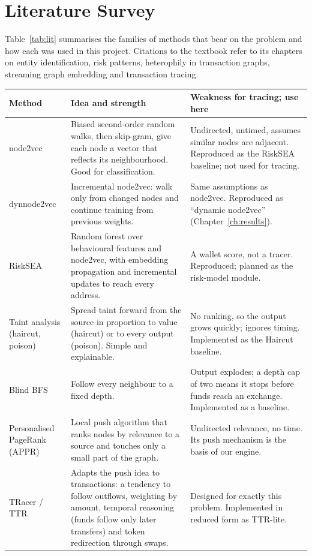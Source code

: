 \section{Literature Survey}
\label{sec:litsurvey}
Table~\ref{tab:lit} summarises the families of methods that bear on the problem and how each was used in this project. Citations to the textbook refer to its chapters on entity identification, risk patterns, heterophily in transaction graphs, streaming graph embedding and transaction tracing.

\begin{table}[H]
\centering\small\singlespacing
\begin{tabular}{p{2.9cm} p{4.7cm} p{4.7cm}}
\toprule
\textbf{Method} & \textbf{Idea and strength} & \textbf{Weakness for tracing; use here}\\
\midrule
node2vec \cite{node2vec} & Biased second-order random walks, then skip-gram, give each node a vector that reflects its neighbourhood. Good for classification. & Undirected, untimed, assumes similar nodes are adjacent. Reproduced as the RiskSEA baseline; not used for tracing.\\
dynnode2vec \cite{dynnode2vec} & Incremental node2vec: walk only from changed nodes and continue training from previous weights. & Same assumptions as node2vec. Reproduced as ``dynamic node2vec'' (Chapter~\ref{ch:results}).\\
RiskSEA \cite{risksea} & Random forest over behavioural features and node2vec, with embedding propagation and incremental updates to reach every address. & A wallet score, not a tracer. Reproduced; planned as the risk-model module.\\
Taint analysis (haircut, poison) \cite{textbook} & Spread taint forward from the source in proportion to value (haircut) or to every output (poison). Simple and explainable. & No ranking, so the output grows quickly; ignores timing. Implemented as the Haircut baseline.\\
Blind BFS \cite{textbook} & Follow every neighbour to a fixed depth. & Output explodes; a depth cap of two means it stops before funds reach an exchange. Implemented as a baseline.\\
Personalised PageRank (APPR) \cite{pagerank,appr} & Local push algorithm that ranks nodes by relevance to a source and touches only a small part of the graph. & Undirected relevance, no time. Its push mechanism is the basis of our engine.\\
TRacer / TTR \cite{tracer,textbook} & Adapts the push idea to transactions: a tendency to follow outflows, weighting by amount, temporal reasoning (funds follow only later transfers) and token redirection through swaps. & Designed for exactly this problem. Implemented in reduced form as TTR-lite.\\

\end{tabular}
\end{table}
